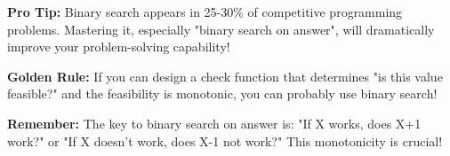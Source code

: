 \documentclass[11pt,a4paper,oneside]{book}
\begin{document}
\vspace{1cm}

\begin{center}
\begin{tcolorbox}[
    enhanced,
    colback=white,
    colframe=successgreen,
    boxrule=2pt,
    arc=4mm,
    width=0.75\textwidth
]
\centering
\textcolor{successgreen}{\textbf{Pro Tip:}} Binary search appears in 25-30\% of competitive programming problems. Mastering it, especially "binary search on answer", will dramatically improve your problem-solving capability!
\end{tcolorbox}
\end{center}

\vspace{1cm}

\begin{center}
\begin{tcolorbox}[
    enhanced,
    colback=white,
    colframe=accentorange,
    boxrule=2pt,
    arc=4mm,
    width=0.75\textwidth
]
\centering
\textcolor{accentorange}{\textbf{Golden Rule:}} If you can design a check function that determines "is this value feasible?" and the feasibility is monotonic, you can probably use binary search!
\end{tcolorbox}
\end{center}

\vspace{1cm}

\begin{center}
\begin{tcolorbox}[
    enhanced,
    colback=white,
    colframe=softpurple,
    boxrule=2pt,
    arc=4mm,
    width=0.75\textwidth
]
\centering
\textcolor{softpurple}{\textbf{Remember:}} The key to binary search on answer is: "If X works, does X+1 work?" or "If X doesn't work, does X-1 not work?" This monotonicity is crucial!
\end{tcolorbox}
\end{center}
\end{document}
